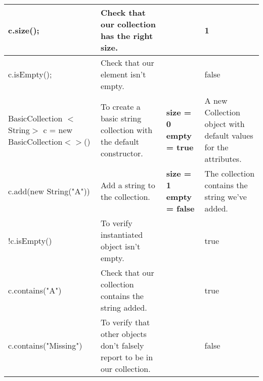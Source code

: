 \documentclass[12pt]{article}
\begin{document}
\begin{table}[htbp]
\begin{center}
{\begin{tabular}{ | l | p{5cm} | p{5cm} | p{5cm} | }
c.size(); &
Check that our collection has the right size. &
&
1 \\
\hline

c.isEmpty(); &
Check that our element isn't empty. &
&
false \\
\hline

BasicCollection $<$String$>$ c = new BasicCollection$<>$() & 
To create a basic string collection with the default constructor. & 
\textbf{size = 0} \newline \textbf{empty = true} & 
A new Collection object with default values for the attributes. \\
\hline

c.add(new String("A")) &
Add a string to the collection. &
\textbf{size = 1} \newline \textbf{empty = false} &
The collection contains the string we've added.\\
\hline

!c.isEmpty() &
To verify instantiated object isn't empty. &
&
true \\
\hline

c.contains("A") &
Check that our collection contains the string added. &
&
true \\
\hline

c.contains("Missing") &
To verify that other objects don't falsely report to be in our collection. &
&
false \\
\hline

\end{tabular}

}
\end{center}
\end{table}
\end{document}

